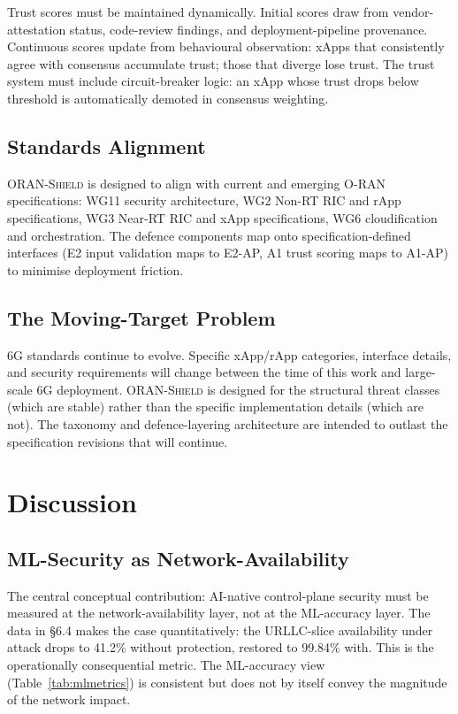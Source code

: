 \documentclass[sigconf,nonacm]{acmart}
\begin{document}
Trust scores must be maintained dynamically. Initial scores
draw from vendor-attestation status, code-review findings, and
deployment-pipeline provenance. Continuous scores update from
behavioural observation: xApps that consistently agree with
consensus accumulate trust; those that diverge lose trust. The
trust system must include circuit-breaker logic: an xApp whose
trust drops below threshold is automatically demoted in
consensus weighting.

\subsection{Standards Alignment}

\textsc{ORAN-Shield} is designed to align with current and
emerging O-RAN specifications: WG11 security architecture,
WG2 Non-RT RIC and rApp specifications, WG3 Near-RT RIC and
xApp specifications, WG6 cloudification and orchestration. The
defence components map onto specification-defined interfaces
(E2 input validation maps to E2-AP, A1 trust scoring maps to A1-AP)
to minimise deployment friction.

\subsection{The Moving-Target Problem}

6G standards continue to evolve. Specific xApp/rApp categories,
interface details, and security requirements will change between
the time of this work and large-scale 6G deployment.
\textsc{ORAN-Shield} is designed for the structural threat
classes (which are stable) rather than the specific
implementation details (which are not). The taxonomy and
defence-layering architecture are intended to outlast the
specification revisions that will continue.

\section{Discussion}

\subsection{ML-Security as Network-Availability}

The central conceptual contribution: AI-native control-plane
security must be measured at the network-availability layer,
not at the ML-accuracy layer. The data in §6.4 makes the case
quantitatively: the URLLC-slice availability under attack drops
to 41.2\% without protection, restored to 99.84\% with. This is
the operationally consequential metric. The ML-accuracy view
(Table~\ref{tab:mlmetrics}) is consistent but does not by itself
convey the magnitude of the network impact.
\end{document}
